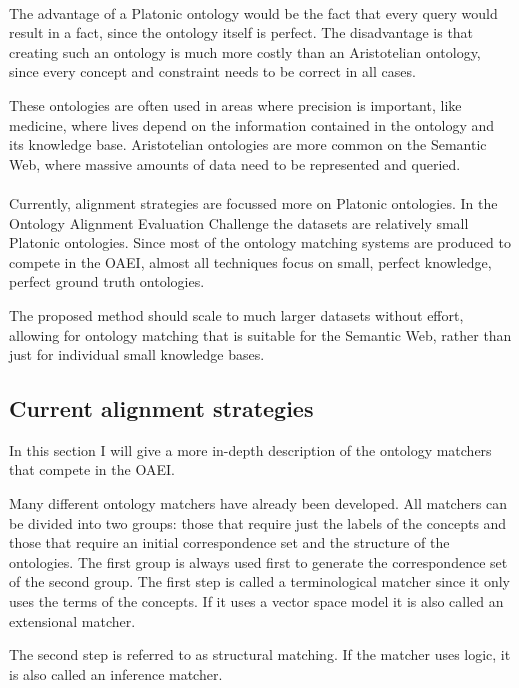 \documentclass{article}
\begin{document}
 \paragraph{}
 The advantage of a Platonic ontology would be the fact that every query would result in a fact, since the ontology itself is perfect. The disadvantage is that creating such an ontology is much more costly than an Aristotelian ontology, since every concept and constraint needs to be correct in all cases. 
 
 These ontologies are often used in areas where precision is important, like medicine, where lives depend on the information contained in the ontology and its knowledge base. Aristotelian ontologies are more common on the Semantic Web, where massive amounts of data need to be represented and queried.
 \paragraph{}
 Currently, alignment strategies are focussed more on Platonic ontologies. In the Ontology Alignment Evaluation Challenge the datasets are relatively small Platonic ontologies. Since most of the ontology matching systems are produced to compete in the OAEI, almost all techniques focus on small, perfect knowledge, perfect ground truth ontologies.
 
 The proposed method should scale to much larger datasets without effort, allowing for ontology matching that is suitable for the Semantic Web, rather than just for individual small knowledge bases.
 
 \subsection{Current alignment strategies} \label{strategies}
 In this section I will give a more in-depth description of the ontology matchers that compete in the OAEI.
 
 Many different ontology matchers have already been developed. All matchers can be divided into two groups: those that require just the labels of the concepts and those that require an initial correspondence set and the structure of the ontologies. The first group is always used first to generate the correspondence set of the second group. The first step is called a terminological matcher since it only uses the terms of the concepts. If it uses a vector space model it is also called an extensional matcher.
 
 The second step is referred to as structural matching. If the matcher uses logic, it is also called an inference matcher\cite{future}.
\end{document}
